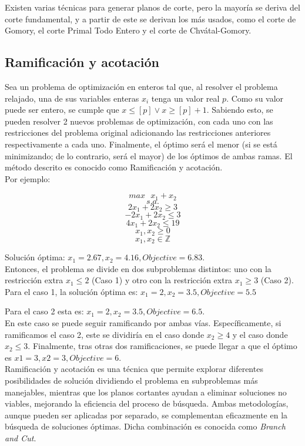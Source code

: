 \documentclass[12pt]{report}
\begin{document}
Existen varias técnicas para generar planos de corte, pero la mayoría se deriva del corte fundamental, y a partir de este se derivan los más usados, como el corte de Gomory, el corte Primal Todo Entero y el corte  de Chvátal-Gomory.\\


\subsection{Ramificación y acotación}

Sea un problema de optimización en enteros tal que, al resolver el problema relajado, una de sus variables enteras $x_i$ tenga un valor real $p$. Como su valor puede ser entero, se cumple que $x \leq  [p] \lor  x \geq  [p]+1$. Sabiendo esto, se pueden resolver 2 nuevos problemas de optimización, con cada uno con las restricciones del problema original adicionando las restricciones anteriores respectivamente a cada uno. Finalmente, el óptimo será el menor (si se está minimizando; de lo contrario, será el mayor) de los óptimos de ambas ramas. El método descrito es conocido como Ramificación y acotación. \\

Por ejemplo:

$$max \text{ } x_1 + x_2$$
$$s.a.$$
$$2x_1 + 2x_2 \geq  3$$
$$-2x_1 + 2x_2 \leq  3$$
$$4x_1 + 2x_2 \leq  19$$
$$x_1, x_2 \geq  0$$
$$x_1, x_2 \in \mathbb{Z}$$

Solución óptima: $x_1=2.67, x_2=4.16, Objective=6.83$.\\

Entonces, el problema se divide en dos subproblemas distintos: uno con la restricción extra $x_1\leq 2$ (Caso 1) y otro con la restricción extra $x_1\geq 3$ (Caso 2).\\

Para el caso 1, la solución óptima es: $x_1=2, x_2=3.5, Objective=5.5$

Para el caso 2 esta es: $x_1=2, x_2=3.5, Objective=6.5$.\\

En este caso se puede seguir ramificando por ambas vías. Específicamente, si ramificamos el caso 2, este se dividiría en el caso donde $x_2\geq 4$ y el caso donde $x_2\leq 3$. Finalmente, tras otras dos ramificaciones, se puede llegar a que el óptimo es $x1=3, x2=3, Objective=6$.\\

Ramificación y acotación es una técnica que permite explorar diferentes posibilidades de solución dividiendo el problema en subproblemas más manejables, mientras que los planos cortantes ayudan a eliminar soluciones no viables, mejorando la eficiencia del proceso de búsqueda. Ambas metodologías, aunque pueden ser aplicadas por separado, se complementan eficazmente en la búsqueda de soluciones óptimas. Dicha combinación es conocida como \textit{Branch and Cut}. 
\end{document}
